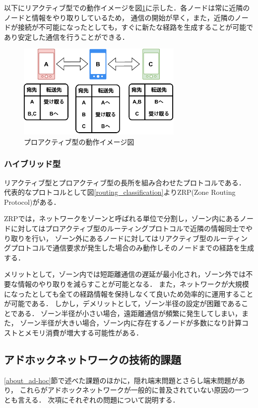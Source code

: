 \documentclass[a4paper, 11pt]{ltjsarticle}
\begin{document}
以下にリアクティブ型での動作イメージを図\ref{proactive}に示した．各ノードは常に近隣のノードと情報をやり取りしているため，
通信の開始が早く，また，近隣のノードが接続が不可能になったとしても，すぐに新たな経路を生成することが可能であり安定した通信を行うことができる．
\begin{figure}[H]
  \centering
  \includegraphics[width=80mm]{proactive_model.pdf}
  \caption{プロアクティブ型の動作イメージ図}
  \label{proactive}
\end{figure}

\subsubsection{ハイブリッド型}
リアクティブ型とプロアクティブ型の長所を組み合わせたプロトコルである．
代表的なプロトコルとして図\ref{routing_classification}よりZRP(Zone Routing Protocol)\cite{1574231874891177344}がある．

ZRPでは，ネットワークをゾーンと呼ばれる単位で分割し，ゾーン内にあるノードに対してはプロアクティブ型のルーティングプロトコルで近隣の情報同士でやり取りを行い，
ゾーン外にあるノードに対してはリアクティブ型のルーティングプロトコルで通信要求が発生した場合のみ動作しそのノードまでの経路を生成する．

メリットとして，ゾーン内では短距離通信の遅延が最小化され，ゾーン外では不要な情報のやり取りを減らすことが可能となる．
また，ネットワークが大規模になったとしても全ての経路情報を保持しなくて良いため効率的に運用することが可能である．
しかし，デメリットとして，ゾーン半径の設定が困難であることである．
ゾーン半径が小さい場合，遠距離通信が頻繁に発生してしまい，また，
ゾーン半径が大きい場合，ゾーン内に存在するノードが多数になり計算コストとメモリ消費が増大する可能性がある．

\subsection{アドホックネットワークの技術的課題}
\ref{about_ad-hoc}節で述べた課題のほかに，隠れ端末問題とさらし端末問題があり，
これらがアドホックネットワークが一般的に普及されていない原因の一つとも言える\cite{松井_進2012KJ00008330022}．
次項にそれぞれの問題について説明する．
\end{document}
